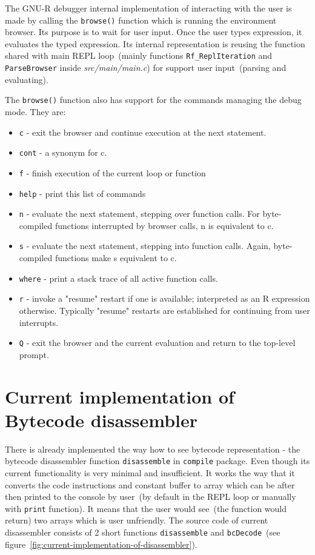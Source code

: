 \documentclass[thesis=M,english]{FITthesis}[2018/10/20]
\newcommand{\code}[1]{\texttt{#1}}
\begin{document}
The GNU-R debugger internal implementation of interacting with the user is made by calling the \code{browse()} function which is running the environment browser. Its purpose is to wait for user input. Once the user types expression, it evaluates the typed expression. Its internal representation is reusing the function shared with main REPL loop~(mainly functions \code{Rf{\_}ReplIteration} and \code{ParseBrowser} inside \textit{src/main/main.c}) for support user input~(parsing and evaluating).

The \code{browse()} function also has support for the commands managing the debug mode. They are:
\begin{itemize}
\item \code{c} - exit the browser and continue execution at the next statement.
\item \code{cont} - a synonym for c.
\item \code{f} - finish execution of the current loop or function
\item \code{help} - print this list of commands
\item \code{n} - evaluate the next statement, stepping over function calls. For byte-compiled functions interrupted by browser calls, n is equivalent to c.
\item \code{s} - evaluate the next statement, stepping into function calls. Again, byte-compiled functions make s equivalent to c.
\item \code{where} - print a stack trace of all active function calls.
\item \code{r} - invoke a "resume" restart if one is available; interpreted as an R expression otherwise. Typically "resume" restarts are established for continuing from user interrupts.
\item \code{Q} - exit the browser and the current evaluation and return to the top-level prompt.

\end{itemize}

\section{Current implementation of Bytecode disassembler}\label{current-bc-disassembler}

There is already implemented the way how to see bytecode representation - the bytecode disassembler function \code{disassemble} in \code{compile} package. Even though its current functionality is very minimal and insufficient. It works the way that it converts the code instructions and constant buffer to array which can be after then printed to the console by user~(by default in the REPL loop or manually with \code{print} function). It means that the user would see~(the function would return) two arrays which is user unfriendly. The source code of current disassembler consists of 2 short functions \code{disassemble} and \code{bcDecode}~(see figure~\ref{fig:current-implementation-of-disassembler}).
\end{document}
